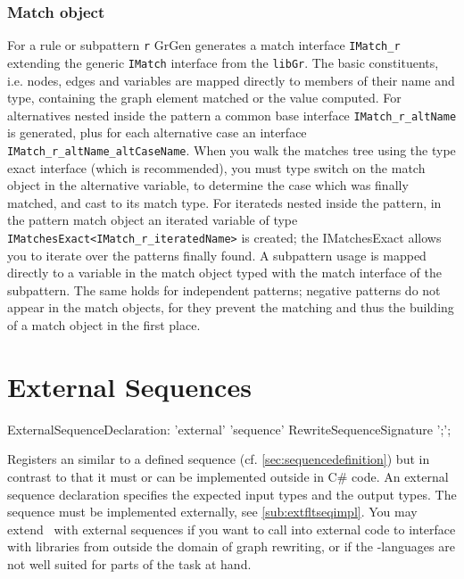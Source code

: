 \subsubsection*{Match object}

For a rule or subpattern \texttt{r} GrGen generates a match interface \texttt{IMatch\_r} extending the generic \texttt{IMatch} interface from the \texttt{libGr}.
The basic constituents, i.e. nodes, edges and variables are mapped directly to members of their name and type, containing the graph element matched or the value computed.
For alternatives nested inside the pattern a common base interface \texttt{IMatch\_r\_altName} is generated, plus for each alternative case an interface \texttt{IMatch\_r\_altName\_altCaseName}. When you walk the matches tree using the type exact interface (which is recommended), you must type switch on the match object in the alternative variable, to determine the case which was finally matched, and cast to its match type.
For iterateds nested inside the pattern, in the pattern match object an iterated variable of type \texttt{IMatchesExact<IMatch\_r\_iteratedName>} is created; the IMatchesExact allows you to iterate over the patterns finally found. 
A subpattern usage is mapped directly to a variable in the match object typed with the match interface of the subpattern.
The same holds for independent patterns; negative patterns do not appear in the match objects, for they prevent the matching and thus the building of a match object in the first place.

\section{External Sequences}\label{sub:extseq}
\begin{rail}
  ExternalSequenceDeclaration: 
    'external' 'sequence' RewriteSequenceSignature ';';
\end{rail}
Registers an  similar to a defined sequence (cf. \ref{sec:sequencedefinition}) but in contrast to that it must or can be implemented outside in C\# code.
An external sequence declaration specifies the expected input types and the output types. The sequence must be implemented externally, see \ref{sub:extfltseqimpl}.
You may extend \GrG~with external sequences if you want to call into external code to interface with libraries from outside the domain of graph rewriting, or if the \GrG-languages are not well suited for parts of the task at hand.

